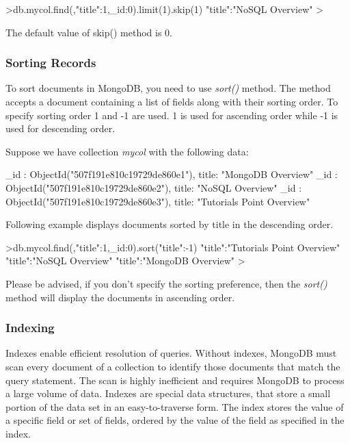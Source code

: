 \documentclass[12pt]{article}
\begin{document}
\begin{bashcode}
\begin{bashcode}
\begin{bashcode}
>db.mycol.find({},{"title":1,_id:0}).limit(1).skip(1)
{"title":"NoSQL Overview"}
>
\end{bashcode}
The default value of skip() method is 0.

\subsubsection{Sorting Records}

To sort documents in MongoDB, you need to use \emph{sort()} method. The
method accepts a document containing a list of fields along with their
sorting order. To specify sorting order 1 and -1 are used. 1 is used for
ascending order while -1 is used for descending order.

Suppose we have collection \emph{mycol} with the following data:
\begin{javascriptcode}
{_id : ObjectId("507f191e810c19729de860e1"), title: "MongoDB Overview"}
{_id : ObjectId("507f191e810c19729de860e2"), title: "NoSQL Overview"}
{_id : ObjectId("507f191e810c19729de860e3"), title: "Tutorials Point Overview"}
\end{javascriptcode}

Following example displays documents sorted by title in the descending order.

\begin{bashcode}
>db.mycol.find({},{"title":1,_id:0}).sort({"title":-1})
{"title":"Tutorials Point Overview"}
{"title":"NoSQL Overview"}
{"title":"MongoDB Overview"}
>
\end{bashcode}

Please be advised, if you don't specify the sorting preference, then the
\emph{sort()} method will display the documents in ascending order.

\newpage
\subsubsection{Indexing}

Indexes enable efficient resolution of queries. Without indexes, MongoDB
must scan every document of a collection to identify those documents
that match the query statement. The scan is highly inefficient and
requires MongoDB to process a large volume of data. Indexes are special
data structures, that store a small portion of the data set in an
easy-to-traverse form. The index stores the value of a specific field or
set of fields, ordered by the value of the field as specified in the
index.


\end{bashcode}
\end{bashcode}
\end{document}
